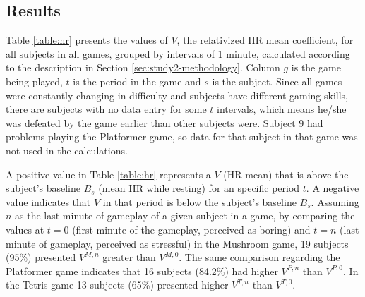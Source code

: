 \subsection{Results}

Table \ref{table:hr} presents the values of $V$, the relativized HR mean coefficient, for all subjects in all games, grouped by intervals of 1 minute, calculated according to the description in Section \ref{sec:study2-methodology}. Column $g$ is the game being played, $t$ is the period in the game and $s$ is the subject. Since all games were constantly changing in difficulty and subjects have different gaming skills, there are subjects with no data entry for some $t$ intervals, which means he/she was defeated by the game earlier than other subjects were. Subject 9 had problems playing the Platformer game, so data for that subject in that game was not used in the calculations.

A positive value in Table \ref{table:hr} represents a $V$ (HR mean) that is above the subject's baseline $B_s$ (mean HR while resting) for an specific period $t$. A negative value indicates that $V$ in that period is below the subject's baseline $B_s$. Assuming $n$ as the last minute of gameplay of a given subject in a game, by comparing the values at $t=0$ (first minute of the gameplay, perceived as boring) and $t=n$ (last minute of gameplay, perceived as stressful) in the Mushroom game, 19 subjects (95\%) presented $V^{M,n}$ greater than $V^{M,0}$. The same comparison regarding the Platformer game indicates that 16 subjects (84.2\%) had higher $V^{P,n}$ than $V^{P,0}$. In the Tetris game 13 subjects (65\%) presented higher $V^{T,n}$ than $V^{T,0}$.

